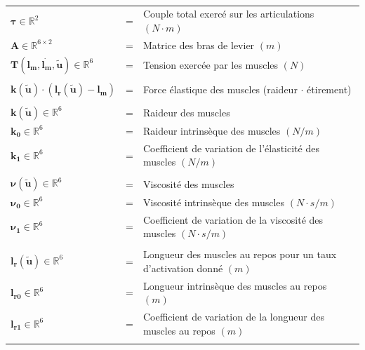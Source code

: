 \documentclass[pdftex,a4paper,11pt]{article}
\newcommand{\vs}[1]{\boldsymbol{#1}} %
\newcommand{\ms}[1]{\boldsymbol{#1}} %
\numberwithin{equation}{subsection}
\begin{document}
\paragraph{}
\begin{small}
\begin{tabular}{lcl}
    $\vs{\tau} \in \mathbb{R}^2$              & = & Couple total exercé sur les articulations $(N \cdot m)$ \\
    $\ms{A} \in \mathbb{R}^{6 \times 2}$      & = & Matrice des bras de levier $(m)$ \\
    $\vs{T}(\vs{l_m}, \vs{\dot{l_m}}, \vs{\tilde{u}}) \in \mathbb{R}^6$  & = & Tension exercée par les muscles $(N)$ \\
    \\
    $\vs{k}(\vs{\tilde{u}}) \cdot (\vs{l_r}(\vs{\tilde{u}}) - \vs{l_m})$ & = & Force élastique des muscles (raideur $\cdot$ étirement) \\
    \\

    $\vs{k}(\vs{\tilde{u}}) \in \mathbb{R}^6$      & = & Raideur des muscles \\
    $\vs{k_0} \in \mathbb{R}^6$               & = & Raideur intrinsèque des muscles $(N/m)$ \\
    $\vs{k_1} \in \mathbb{R}^6$               & = & Coefficient de variation de l'élasticité des muscles $(N/m)$ \\
    \\

    $\vs{\nu}(\vs{\tilde{u}}) \in \mathbb{R}^6$    & = & Viscosité des muscles \\
    $\vs{\nu_0} \in \mathbb{R}^6$             & = & Viscosité intrinsèque des muscles $(N \cdot s/m)$ \\
    $\vs{\nu_1} \in \mathbb{R}^6$             & = & Coefficient de variation de la viscosité des muscles $(N \cdot s/m)$ \\
    \\

    $\vs{l_r}(\vs{\tilde{u}}) \in \mathbb{R}^6$    & = & Longueur des muscles au repos pour un taux d'activation donné $(m)$ \\
    $\vs{l_{r0}} \in \mathbb{R}^6$            & = & Longueur intrinsèque des muscles au repos $(m)$ \\
    $\vs{l_{r1}} \in \mathbb{R}^6$            & = & Coefficient de variation de la longueur des muscles au repos $(m)$ \\
    \\


\end{tabular}
\end{small}
\end{document}

